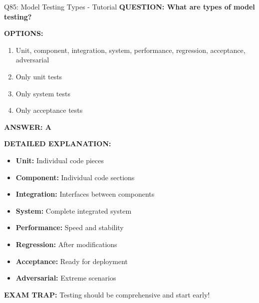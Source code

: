 \documentclass[8pt]{beamer}
\begin{document}
	\begin{frame}{Q85: Model Testing Types - Tutorial}
		\fontsize{6.5}{7.5}\selectfont
		\textbf{QUESTION: What are types of model testing?}
		
		\vspace{0.1cm}
		\textbf{OPTIONS:}
		\begin{enumerate}
			\item Unit, component, integration, system, performance, regression, acceptance, adversarial
			\item Only unit tests
			\item Only system tests
			\item Only acceptance tests
		\end{enumerate}
		
		\vspace{0.1cm}
		\textcolor{myblue}{\textbf{ANSWER: A}}
		
		\vspace{0.1cm}
		\textbf{DETAILED EXPLANATION:}
		\begin{itemize}
			\item \textbf{Unit:} Individual code pieces
			\item \textbf{Component:} Individual code sections
			\item \textbf{Integration:} Interfaces between components
			\item \textbf{System:} Complete integrated system
			\item \textbf{Performance:} Speed and stability
			\item \textbf{Regression:} After modifications
			\item \textbf{Acceptance:} Ready for deployment
			\item \textbf{Adversarial:} Extreme scenarios
		\end{itemize}
		
		\vspace{0.1cm}
		\textcolor{myred}{\textbf{EXAM TRAP:}} Testing should be \textcolor{myblue}{comprehensive and start early}!
	\end{frame}
	
\end{document}
